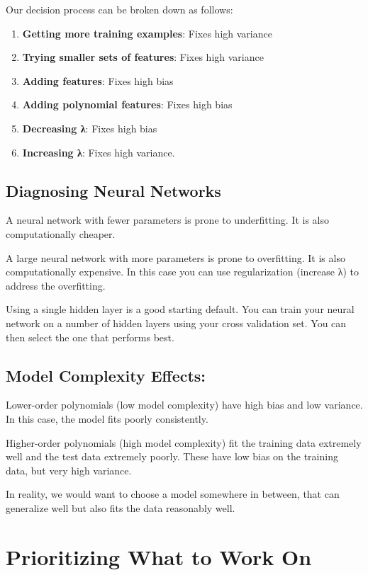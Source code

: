 \documentclass[10pt,a4paper,UTF8]{article}
\begin{document}
Our decision process can be broken down as follows:

\begin{enumerate}
\item \textbf{Getting more training examples}: Fixes high variance
\item \textbf{Trying smaller sets of features}: Fixes high variance
\item \textbf{Adding features}: Fixes high bias
\item \textbf{Adding polynomial features}: Fixes high bias
\item \textbf{Decreasing λ}: Fixes high bias
\item \textbf{Increasing λ}: Fixes high variance.
\end{enumerate}

\subsection{Diagnosing Neural Networks}
\label{sec:org8018d31}

A neural network with fewer parameters is prone to underfitting. It is also computationally cheaper.

A large neural network with more parameters is prone to overfitting. It is also computationally expensive. In this case you can use regularization (increase λ) to address the overfitting.

Using a single hidden layer is a good starting default. You can train your neural network on a number of hidden layers using your cross validation set. You can then select the one that performs best.

\subsection{Model Complexity Effects:}
\label{sec:org3a67fb8}

Lower-order polynomials (low model complexity) have high bias and low variance. In this case, the model fits poorly consistently.

Higher-order polynomials (high model complexity) fit the training data extremely well and the test data extremely poorly. These have low bias on the training data, but very high variance.

In reality, we would want to choose a model somewhere in between, that can generalize well but also fits the data reasonably well.
\section{Prioritizing What to Work On}
\label{sec:orgf97d0e2}
\end{document}
